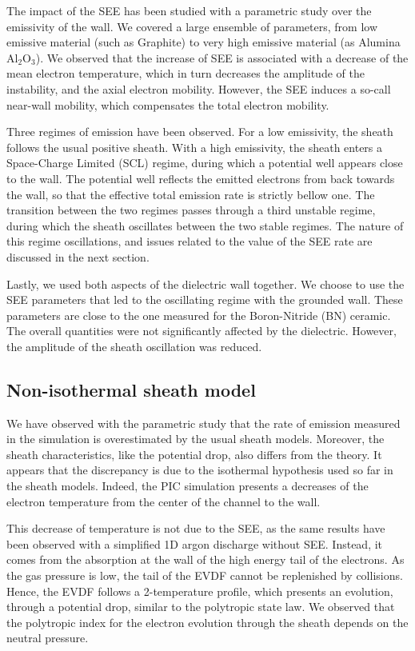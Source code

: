 The impact of the SEE has been studied with a parametric study over the emissivity of the wall.
We covered a large ensemble of parameters, from low emissive material (such as Graphite) to very high emissive material (as Alumina Al$_2$O$_3$).
We observed that the increase of SEE is associated with a decrease of the mean electron temperature, which in turn decreases the amplitude of the instability, and the axial electron mobility.
However, the SEE induces a so-call near-wall mobility, which compensates the total electron  mobility.

Three regimes of emission have been observed.
For a low emissivity, the sheath follows the usual positive sheath.
With a high emissivity, the sheath enters a Space-Charge Limited (SCL) regime, during which a potential well appears close to the wall.
The potential well reflects the emitted electrons from back towards the wall, so that the effective total emission rate is strictly bellow one.
The transition between the two regimes passes through a third unstable regime, during which the sheath oscillates between the two stable regimes.
The nature of this regime oscillations, and issues related to the value of the SEE rate are discussed in the next section.

Lastly, we used both aspects of the dielectric wall together.
We choose to use the SEE parameters that led to the oscillating regime with the grounded wall.
These parameters are close to the one measured for the Boron-Nitride (BN) ceramic.
The overall quantities were not significantly affected by the dielectric.
However, the amplitude of the sheath oscillation was reduced.

\subsection{Non-isothermal sheath model}

We have observed with the parametric study that the rate of emission measured in the simulation is overestimated by the usual sheath models.
Moreover, the sheath characteristics, like the potential drop, also differs from the theory.
It appears that the discrepancy is due to the isothermal hypothesis used so far in the sheath models.
Indeed, the PIC simulation presents a decreases of the electron temperature from the center of the channel to the wall.

This decrease of temperature is not due to the SEE, as the same results have been observed with a simplified 1D argon discharge without SEE.
Instead, it comes from the absorption at the wall of the high energy tail of the electrons.
As the gas pressure is low, the tail of the EVDF cannot be replenished by collisions.
Hence, the EVDF follows a 2-temperature profile, which presents an evolution, through a potential drop, similar to the polytropic state law. 
We observed that the polytropic index for the electron evolution through the sheath depends on the neutral pressure.

